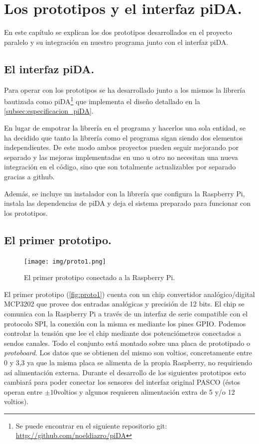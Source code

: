 \chapter{Los prototipos y el interfaz piDA.}

	En este capítulo se explican los dos prototipos desarrollados en el proyecto paralelo y su integración en nuestro programa junto con el interfaz piDA.
	
		\section{El interfaz piDA.}
		Para operar con los prototipos se ha desarrollado junto a los mismos la librería bautizada como piDA\footnote{Se puede encontrar en el siguiente repositorio git: \url{http://github.com/noeldiazro/piDA}} que implementa el diseño detallado en la \autoref{subsec:especificacion_piDA}.
		
		En lugar de empotrar la librería en el programa y hacerlos una sola entidad, se ha decidido que tanto la librería como el programa sigan siendo dos elementos independientes. De este modo ambos proyectos pueden seguir mejorando por separado y las mejoras implementadas en uno u otro no necesitan una nueva integración en el código, sino que son totalmente actualizables por separado gracias a github.
		
		Además, se incluye un instalador con la librería que configura la Raspberry Pi, instala las dependencias de piDA y deja el sistema preparado para funcionar con los prototipos.


	\section{El primer prototipo.}\label{sec:primer_prototipo}
			\begin{figure}[H]
			\centering
		  	\texttt{[image: img/proto1.png]}
  			\caption{El primer prototipo conectado a la Raspberry Pi.}\label{fig:proto1}
		\end{figure}
		El primer prototipo (\autoref{fig:proto1}) cuenta con un chip convertidor analógico/digital MCP3202 que provee dos entradas analógicas y precisión de 12 bits. El chip se comunica con la Raspberry Pi a través de un interfaz de serie compatible con el protocolo SPI, la conexión con la misma es mediante los pines GPIO. Podemos controlar la tensión que lee el chip mediante dos potenciómetros conectados a sendos canales. Todo el conjunto está montado sobre una placa de prototipado o \emph{protoboard}.
		Los datos que se obtienen del mismo son voltios, concretamente entre 0 y 3,3 ya que la misma placa se alimenta de la propia Raspberry, no requiriendo así alimentación externa. Durante el desarrollo de los siguientes prototipos esto cambiará para poder conectar los sensores del interfaz original PASCO (éstos operan entre $ \pm 10 $voltios y algunos requieren alimentación extra de 5 y/o 12 voltios). 
		

